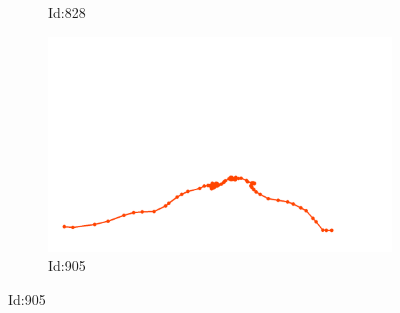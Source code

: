 \documentclass[12pt,twoside]{report}
\begin{document}
\begin{figure}
\begin{subfigure}[b]{0.20\textwidth}
\caption{Id:828}
\end{subfigure}
\begin{subfigure}[b]{0.20\textwidth}
\centering
\includegraphics[width=\textwidth]{../../trajectories/905.png}
\caption{Id:905}
\end{subfigure}
\end{figure}
\end{document}
